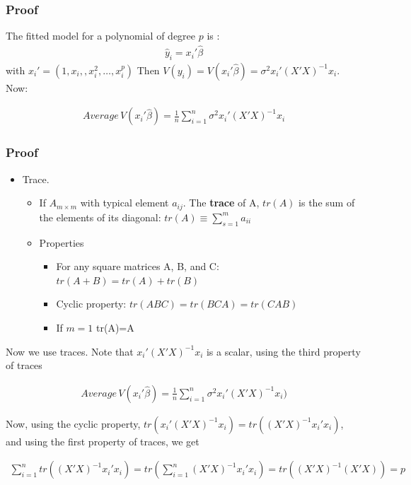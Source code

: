 \documentclass[
  shownotes,
  xcolor={svgnames},
  hyperref={colorlinks,citecolor=DarkBlue,linkcolor=DarkRed,urlcolor=DarkBlue}
  ]{beamer}
\newenvironment{Shaded}{\begin{snugshade}}{\end{snugshade}}
\begin{document}
\begin{frame}[fragile]
\frametitle{Proof}


The fitted model for a polynomial of degree $p$ is :
\begin{align}
\hat y_i = x_i'\hat\beta  
\end{align}
with  $x_i'=(1,x_i,,x_i^2,\dots,x_i^p)$
Then $V(y_i) = V(x_i'\hat\beta)= \sigma^2 x_i'(X'X)^{-1}x_i$. Now:

\begin{align}
Average\, V(x_i'\hat \beta)=\frac{1}{n}\sum_{i=1}^n \sigma^2 x_i'(X'X)^{-1}x_i
\end{align}

\end{frame}
\begin{frame}[fragile]
\frametitle{Proof}

\begin{scriptsize}
\begin{Shaded}
\begin{itemize}
  \item Trace.
  \begin{itemize}
    \tiny
  \item If $A_{m\times m}$ with typical element $a_{ij}$. The {\bf trace} of A, $tr(A)$ is the sum of the elements of its diagonal: $tr(A)\equiv \sum_{s=1}^m a_{ii}$
  \item Properties
  \begin{itemize}
    \tiny
    \item For any square matrices A, B, and C: $tr(A+B)=tr(A)+tr(B)$
    \item Cyclic property: $tr(ABC)=tr(BCA)=tr(CAB)$
    \item If $m=1$ tr(A)=A
  \end{itemize}
  \end{itemize}
\end{itemize}
\end{Shaded}
\end{scriptsize}
Now we use traces. Note that $x_i'(X'X)^{-1}x_i$ is a scalar, using the third property of traces

\begin{align}
Average\,V(x_i'\hat \beta)=\frac{1}{n}\sum_{i=1}^n \sigma^2 x_i'(X'X)^{-1}x_i)
\end{align}

Now, using the cyclic property, $tr(x_i'(X'X)^{-1}x_i)=tr((X'X)^{-1}x_i'x_i)$, and using the first property of traces, we get

\begin{align}
\sum_{i=1}^n tr((X'X)^{-1}x_i'x_i) = tr(\sum_{i=1}^n (X'X)^{-1}x_i'x_i) =tr ((X'X)^{-1}(X'X)) = p
\end{align}

\end{frame}
\end{document}
